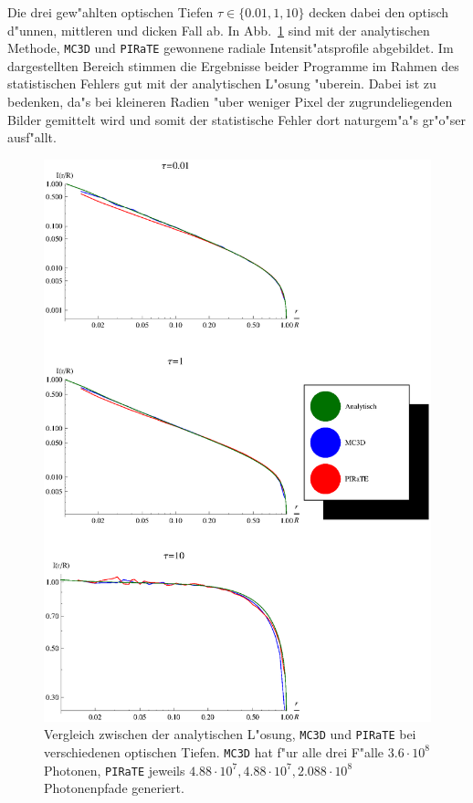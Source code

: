 	Die drei gew"ahlten optischen Tiefen $\tau\in\{0.01,1,10\}$ decken dabei den optisch d"unnen, mittleren und dicken Fall ab.	In Abb.~\ref{fig:methodcomparisongraphics} sind mit der analytischen Methode, \texttt{MC3D} und \texttt{PIRaTE} gewonnene radiale Intensit"atsprofile abgebildet.
	Im dargestellten Bereich stimmen die Ergebnisse beider Programme im Rahmen des statistischen Fehlers gut mit der analytischen L"osung "uberein. Dabei ist zu bedenken, da"s bei kleineren Radien "uber weniger Pixel der zugrundeliegenden Bilder gemittelt wird und somit der statistische Fehler dort naturgem"a"s gr"o"ser ausf"allt.
		\begin{figure}
			\centering
			\includegraphics[height=1.0\textheight]{methodcomparisongraphics.eps}
			\caption{Vergleich zwischen der analytischen L"osung, \texttt{MC3D} und \texttt{PIRaTE} bei verschiedenen optischen Tiefen. \texttt{MC3D} hat f"ur alle drei F"alle $3.6\cdot10^8$ Photonen, \texttt{PIRaTE} jeweils $4.88\cdot10^7,4.88\cdot10^7,2.088\cdot10^8$ Photonenpfade generiert.}
			\label{fig:methodcomparisongraphics}
		\end{figure}
	
